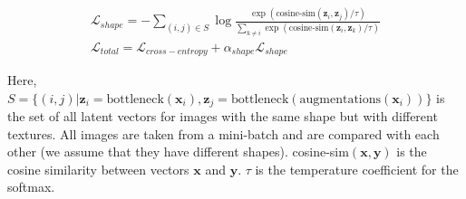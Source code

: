 \begin{gather}
    \mathcal{L}_{shape} = - \sum_{(i,j) \in S} \log \frac{\exp(\text{cosine-sim}(\mathbf{z}_i, \mathbf{z}_j) / \tau)}{\sum_{k \neq i} \exp(\text{cosine-sim}(\mathbf{z}_i, \mathbf{z}_k) / \tau)} \\
    \mathcal{L}_{total} = \mathcal{L}_{cross-entropy} + \alpha_{shape} \mathcal{L}_{shape}
\end{gather}

Here, $S = \{ (i, j) | \mathbf{z}_i = \text{bottleneck}(\mathbf{x}_i), \mathbf{z}_j = \text{bottleneck}(\text{augmentations}(\mathbf{x}_i)) \}$ is the set of all latent vectors for images with the same shape but with different textures.
All images are taken from a mini-batch and are compared with each other (we assume that they have different shapes).
cosine-sim$(\mathbf{x}, \mathbf{y})$ is the cosine similarity between vectors $\mathbf{x}$ and $\mathbf{y}$.
$\tau$ is the temperature coefficient for the softmax.
